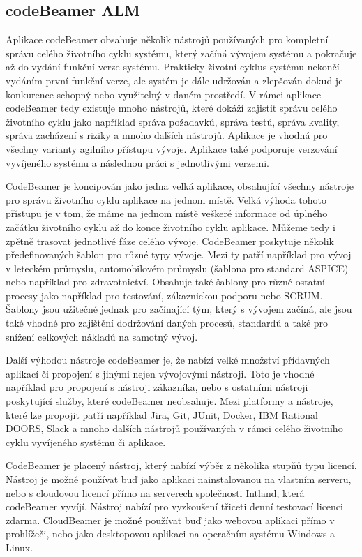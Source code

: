 \documentclass[czech,master,public,dept460,male,cpdeclaration,oneside]{diploma}
\begin{document}
\subsection{codeBeamer ALM}
\label{sec:codebeamer}
Aplikace codeBeamer obsahuje několik nástrojů používaných pro kompletní správu celého životního cyklu systému, který začíná vývojem systému a pokračuje až do vydání funkční verze systému. Prakticky životní cyklus systému nekončí vydáním první funkční verze, ale systém je dále udržován a zlepšován dokud je konkurence schopný nebo využitelný v daném prostředí. V rámci aplikace codeBeamer tedy existuje mnoho nástrojů, které dokáží zajistit správu celého životního cyklu jako například správa požadavků, správa testů, správa kvality, správa zacházení s riziky a mnoho dalších nástrojů. Aplikace je vhodná pro všechny varianty agilního přístupu vývoje. Aplikace také podporuje verzování vyvíjeného systému a následnou práci s jednotlivými verzemi. \cite{ref:about_codebeamer}

CodeBeamer je koncipován jako jedna velká aplikace, obsahující všechny nástroje pro správu životního cyklu aplikace na jednom místě. Velká výhoda tohoto přístupu je v tom, že máme na jednom místě veškeré informace od úplného začátku životního cyklu až do konce životního cyklu aplikace. Můžeme tedy i zpětně trasovat jednotlivé fáze celého vývoje. CodeBeamer poskytuje několik předefinovaných šablon pro různé typy vývoje. Mezi ty patří například pro vývoj v leteckém průmyslu, automobilovém průmyslu (šablona pro standard ASPICE) nebo například pro zdravotnictví. Obsahuje také šablony pro různé ostatní procesy jako například pro testování, zákaznickou podporu nebo SCRUM.  \cite{ref:codebeamer_templates} Šablony jsou užitečné jednak pro začínající tým, který s vývojem začíná, ale jsou také vhodné pro zajištění dodržování daných procesů, standardů a také pro snížení celkových nákladů na samotný vývoj.

Další výhodou nástroje codeBeamer je, že nabízí velké množství přídavných aplikací či propojení s jinými nejen vývojovými nástroji. Toto je vhodné například pro propojení s nástroji zákazníka, nebo s ostatními nástroji poskytující služby, které codeBeamer neobsahuje. Mezi platformy a nástroje, které lze propojit patří například Jira, Git, JUnit, Docker, IBM Rational DOORS, Slack a mnoho dalších nástrojů používaných v rámci celého životního cyklu vyvíjeného systému či aplikace.

CodeBeamer je placený nástroj, který nabízí výběr z několika stupňů typu licencí.  Nástroj je možné používat buď jako aplikaci nainstalovanou na vlastním serveru, nebo s cloudovou licencí přímo na serverech společnosti Intland, která codeBeamer vyvíjí. Nástroj nabízí pro vyzkoušení třiceti denní testovací licenci zdarma. CloudBeamer je možné používat buď jako webovou aplikaci přímo v prohlížeči, nebo jako desktopovou aplikaci na operačním systému Windows a Linux. \cite{ref:codebeamer_pricing}
\end{document}
